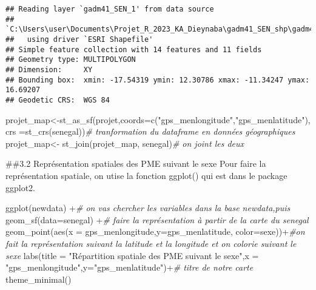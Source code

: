 \documentclass[
]{article}
\newenvironment{Shaded}{\begin{snugshade}}{\end{snugshade}}
\newcommand{\AttributeTok}[1]{\textcolor[rgb]{0.77,0.63,0.00}{#1}}
\newcommand{\CommentTok}[1]{\textcolor[rgb]{0.56,0.35,0.01}{\textit{#1}}}
\newcommand{\FunctionTok}[1]{\textcolor[rgb]{0.00,0.00,0.00}{#1}}
\newcommand{\NormalTok}[1]{#1}
\newcommand{\OtherTok}[1]{\textcolor[rgb]{0.56,0.35,0.01}{#1}}
\newcommand{\SpecialCharTok}[1]{\textcolor[rgb]{0.00,0.00,0.00}{#1}}
\newcommand{\StringTok}[1]{\textcolor[rgb]{0.31,0.60,0.02}{#1}}
\begin{document}
\begin{verbatim}
## Reading layer `gadm41_SEN_1' from data source 
##   `C:\Users\user\Documents\Projet_R_2023_KA_Dieynaba\gadm41_SEN_shp\gadm41_SEN_1.shp' 
##   using driver `ESRI Shapefile'
## Simple feature collection with 14 features and 11 fields
## Geometry type: MULTIPOLYGON
## Dimension:     XY
## Bounding box:  xmin: -17.54319 ymin: 12.30786 xmax: -11.34247 ymax: 16.69207
## Geodetic CRS:  WGS 84
\end{verbatim}

\begin{Shaded}
\begin{Highlighting}[]
\NormalTok{projet\_map}\OtherTok{\textless{}{-}}\FunctionTok{st\_as\_sf}\NormalTok{(projet,}\AttributeTok{coords=}\FunctionTok{c}\NormalTok{(}\StringTok{"gps\_menlongitude"}\NormalTok{,}\StringTok{"gps\_menlatitude"}\NormalTok{), }\AttributeTok{crs =}\FunctionTok{st\_crs}\NormalTok{(senegal))}\CommentTok{\# tranformation du dataframe en données géographiques}
\NormalTok{projet\_map}\OtherTok{\textless{}{-}} \FunctionTok{st\_join}\NormalTok{(projet\_map, senegal)}\CommentTok{\# on joint les deux}
\end{Highlighting}
\end{Shaded}

\#\#3.2 Représentation spatiales des PME suivant le sexe Pour faire la
représentation spatiale, on utise la fonction ggplot() qui est dans le
package ggplot2.

\begin{Shaded}
\begin{Highlighting}[]
\FunctionTok{ggplot}\NormalTok{(newdata) }\SpecialCharTok{+}\CommentTok{\# on vas chercher les variables dans la base newdata,puis}
  \FunctionTok{geom\_sf}\NormalTok{(}\AttributeTok{data=}\NormalTok{senegal) }\SpecialCharTok{+}\CommentTok{\# faire la représentation à partir de la carte du senegal}
  \FunctionTok{geom\_point}\NormalTok{(}\FunctionTok{aes}\NormalTok{(}\AttributeTok{x =}\NormalTok{ gps\_menlongitude,}\AttributeTok{y=}\NormalTok{gps\_menlatitude, }\AttributeTok{color=}\NormalTok{sexe))}\SpecialCharTok{+}\CommentTok{\#on fait la représentation suivant la latitude et la longitude et on colorie suivant le sexe}
  \FunctionTok{labs}\NormalTok{(}\AttributeTok{title =} \StringTok{"Répartition spatiale des PME suivant le sexe"}\NormalTok{,}\AttributeTok{x =} \StringTok{"gps\_menlongitude"}\NormalTok{,}\AttributeTok{y=}\StringTok{"gps\_menlatitude"}\NormalTok{)}\SpecialCharTok{+}\CommentTok{\# titre de notre carte}
  \FunctionTok{theme\_minimal}\NormalTok{()}
\end{Highlighting}
\end{Shaded}
\end{document}
